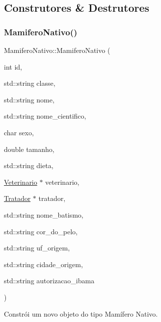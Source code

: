 \subsection{Construtores \& Destrutores}
\mbox{\label{classMamiferoNativo_a7c56682680010d93b58925b766afc798}} 
\subsubsection{\texorpdfstring{Mamifero\+Nativo()}{MamiferoNativo()}\hspace{0.1cm}{\footnotesize\ttfamily [1/3]}}
{\footnotesize\ttfamily Mamifero\+Nativo\+::\+Mamifero\+Nativo (\begin{DoxyParamCaption}\item[{int}]{id,  }\item[{std\+::string}]{classe,  }\item[{std\+::string}]{nome,  }\item[{std\+::string}]{nome\+\_\+cientifico,  }\item[{char}]{sexo,  }\item[{double}]{tamanho,  }\item[{std\+::string}]{dieta,  }\item[{\hyperlink{classVeterinario}{Veterinario} $\ast$}]{veterinario,  }\item[{\hyperlink{classTratador}{Tratador} $\ast$}]{tratador,  }\item[{std\+::string}]{nome\+\_\+batismo,  }\item[{std\+::string}]{cor\+\_\+do\+\_\+pelo,  }\item[{std\+::string}]{uf\+\_\+origem,  }\item[{std\+::string}]{cidade\+\_\+origem,  }\item[{std\+::string}]{autorizacao\+\_\+ibama }\end{DoxyParamCaption})}



Constrói um novo objeto do tipo Mamífero Nativo. 


